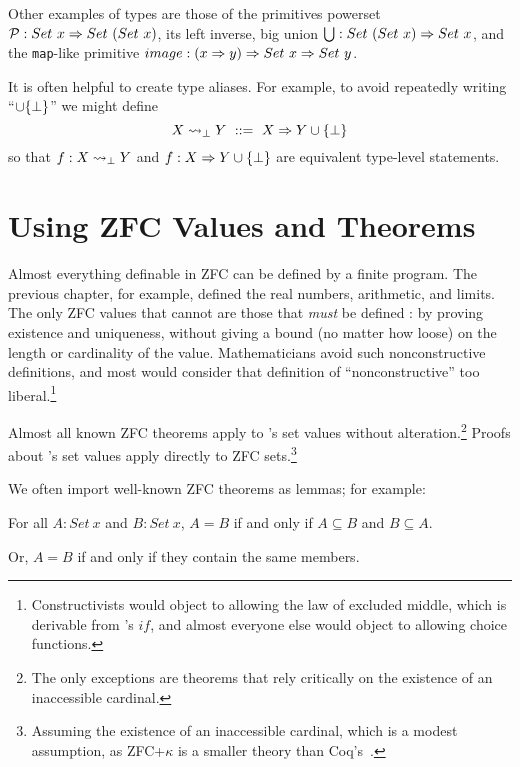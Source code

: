 Other examples of types are those of the \lzfclang primitives powerset $\mathcal{P} : Set~x \Rightarrow Set~(Set~x)$, its left inverse, big union $\textstyle\bigcup : Set~(Set~x) \Rightarrow Set~x$, and the \texttt{map}-like primitive $image : (x \Rightarrow y) \Rightarrow Set~x \Rightarrow Set~y$.

It is often helpful to create type aliases.
For example, to avoid repeatedly writing ``$\cup \{{\bot}\}$'' we might define
\begin{equation}
	X \rightsquigarrow_\bot Y\ ::=\ X \Rightarrow Y \cup \{{\bot}\}
\end{equation}
so that $f : X \rightsquigarrow_\bot Y$ and $f : X \Rightarrow Y \cup \{{\bot}\}$ are equivalent type-level statements.


\section{Using ZFC Values and Theorems}

Almost everything definable in ZFC can be defined by a finite \lzfclang program.
The previous chapter, for example, defined the real numbers, arithmetic, and limits.
The only ZFC values that cannot are those that \emph{must} be defined : by proving existence and uniqueness, without giving a bound (no matter how loose) on the length or cardinality of the value.
Mathematicians avoid such nonconstructive definitions, and most would consider that definition of ``nonconstructive'' too liberal.\footnote{Constructivists would object to allowing the law of excluded middle, which is derivable from \lzfclang's $if$, and almost everyone else would object to allowing choice functions.}

Almost all known ZFC theorems apply to \lzfclang's set values without alteration.\footnote{The only exceptions are theorems that rely critically on the existence of an inaccessible cardinal.}
Proofs about \lzfclang's set values apply directly to ZFC sets.\footnote{Assuming the existence of an inaccessible cardinal, which is a modest assumption, as ZFC+$\kappa$ is a smaller theory than Coq's~\cite{cit:barras-2010-sets-coq}.}

We often import well-known ZFC theorems as lemmas; for example:

\begin{lemma}
For all $A : Set~x$ and $B : Set~x$, $A = B$ if and only if $A \subseteq B$ and $B \subseteq A$.
\end{lemma}
Or, $A = B$ if and only if they contain the same members.

